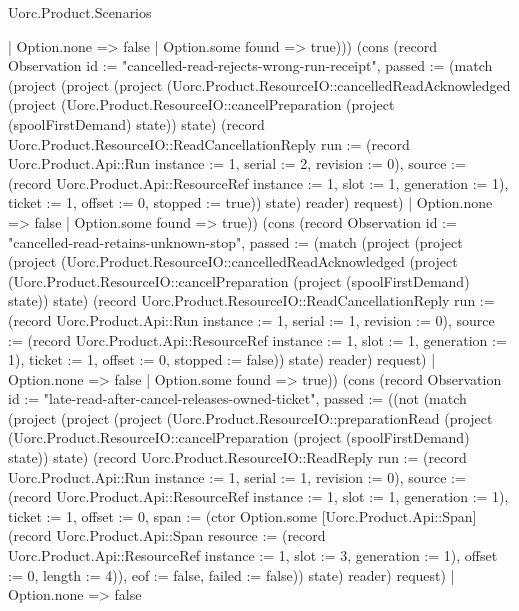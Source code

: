 \begin{lexlean}{Uorc.Product.Scenarios}
\begin{semanticmodule}
{{    | Option.none => false
    | Option.some found => true))}) (cons (record Observation {id := "cancelled-read-rejects-wrong-run-receipt", passed := (match (project (project (project (Uorc.Product.ResourceIO::cancelledReadAcknowledged (project (Uorc.Product.ResourceIO::cancelPreparation (project (spoolFirstDemand) state)) state) (record Uorc.Product.ResourceIO::ReadCancellationReply {run := (record Uorc.Product.Api::Run {instance := 1, serial := 2, revision := 0}), source := (record Uorc.Product.Api::ResourceRef {instance := 1, slot := 1, generation := 1}), ticket := 1, offset := 0, stopped := true})) state) reader) request)
    | Option.none => false
    | Option.some found => true)}) (cons (record Observation {id := "cancelled-read-retains-unknown-stop", passed := (match (project (project (project (Uorc.Product.ResourceIO::cancelledReadAcknowledged (project (Uorc.Product.ResourceIO::cancelPreparation (project (spoolFirstDemand) state)) state) (record Uorc.Product.ResourceIO::ReadCancellationReply {run := (record Uorc.Product.Api::Run {instance := 1, serial := 1, revision := 0}), source := (record Uorc.Product.Api::ResourceRef {instance := 1, slot := 1, generation := 1}), ticket := 1, offset := 0, stopped := false})) state) reader) request)
    | Option.none => false
    | Option.some found => true)}) (cons (record Observation {id := "late-read-after-cancel-releases-owned-ticket", passed := ((not (match (project (project (project (Uorc.Product.ResourceIO::preparationRead (project (Uorc.Product.ResourceIO::cancelPreparation (project (spoolFirstDemand) state)) state) (record Uorc.Product.ResourceIO::ReadReply {run := (record Uorc.Product.Api::Run {instance := 1, serial := 1, revision := 0}), source := (record Uorc.Product.Api::ResourceRef {instance := 1, slot := 1, generation := 1}), ticket := 1, offset := 0, span := (ctor Option.some [Uorc.Product.Api::Span] (record Uorc.Product.Api::Span {resource := (record Uorc.Product.Api::ResourceRef {instance := 1, slot := 3, generation := 1}), offset := 0, length := 4})), eof := false, failed := false})) state) reader) request)
    | Option.none => false
}}
\end{semanticmodule}
\end{lexlean}
